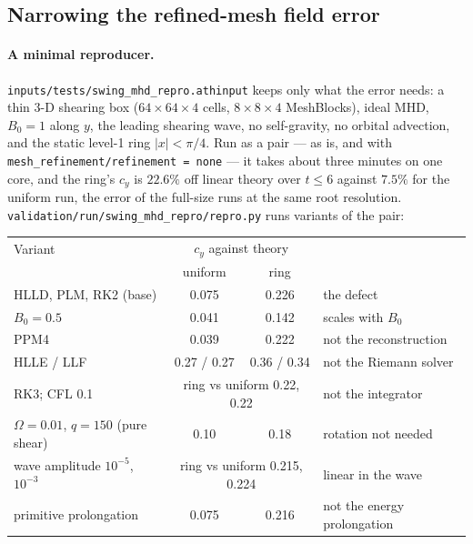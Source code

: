 \documentclass[11pt]{article}
\newcommand{\code}[1]{\texttt{#1}}
\newcommand{\file}[1]{\texttt{#1}}
\begin{document}
\subsection{Narrowing the refined-mesh field error}
\label{sec:swing_repro}

\paragraph{A minimal reproducer.} \file{inputs/tests/swing\_mhd\_repro.athinput} keeps only
what the error needs: a thin 3-D shearing box ($64\times64\times4$ cells, $8\times8\times4$
MeshBlocks), ideal MHD, $B_0 = 1$ along $y$, the leading shearing wave, no self-gravity, no
orbital advection, and the static level-1 ring $|x| < \pi/4$. Run as a pair --- as is, and
with \code{mesh\_refinement/refinement = none} --- it takes about three minutes on one core,
and the ring's $c_y$ is $22.6\%$ off linear theory over $t \le 6$ against $7.5\%$ for the
uniform run, the error of the full-size runs at the same root resolution.
\file{validation/run/swing\_mhd\_repro/repro.py} runs variants of the pair:
\begin{center}
\small
\begin{tabular}{@{}lccl@{}}
\toprule
Variant & \multicolumn{2}{c}{$c_y$ against theory} & \\
 & uniform & ring & \\
\midrule
HLLD, PLM, RK2 (base)                   & 0.075 & 0.226 & the defect \\
$B_0 = 0.5$                             & 0.041 & 0.142 & scales with $B_0$ \\
PPM4                                    & 0.039 & 0.222 & not the reconstruction \\
HLLE / LLF                              & 0.27 / 0.27 & 0.36 / 0.34 & not the Riemann solver \\
RK3; CFL 0.1                            & \multicolumn{2}{c}{ring vs uniform 0.22, 0.22} & not the integrator \\
$\Omega = 0.01$, $q = 150$ (pure shear) & 0.10 & 0.18 & rotation not needed \\
wave amplitude $10^{-5}$, $10^{-3}$     & \multicolumn{2}{c}{ring vs uniform 0.215, 0.224} & linear in the wave \\
primitive prolongation                  & 0.075 & 0.216 & not the energy prolongation \\
\bottomrule
\end{tabular}
\end{center}
\end{document}
